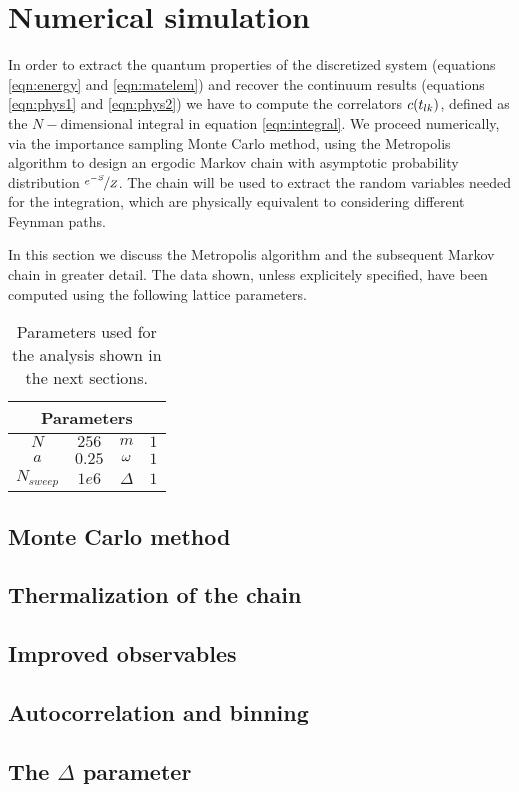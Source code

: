 \section{Numerical simulation}%
\label{sec:numericalsetup}
In order to extract the quantum properties of the discretized system (equations \ref{eqn:energy} and \ref{eqn:matelem}) and recover the continuum results (equations \ref{eqn:phys1} and \ref{eqn:phys2}) we have to compute the correlators $c(t_{lk})$, defined as the $N-$dimensional integral in equation
\ref{eqn:integral}.
We proceed numerically, via the importance sampling Monte Carlo method, using the Metropolis
algorithm to design an ergodic Markov chain with asymptotic probability distribution $\nicefrac{e^{-S}}{Z}$.
The chain will be used to extract the random variables needed for the integration, which are physically equivalent to considering
different Feynman paths.

In this section we discuss the Metropolis algorithm and the subsequent Markov chain in greater detail.
The data shown, unless explicitely specified, have been computed using the following lattice parameters.
\begin{table}[ht]
\centering
\begin{tabularx}{0.6\linewidth}{cccc}
\hline
\multicolumn{4}{c}{Parameters} \\ \hline
$N$              & $256$  & $m$              & $1$      \\
$a$              & $0.25$ & $\omega$             & $1$      \\
$N_{sweep}$      & $1e6$   & $\Delta$ & $1$ \\ \hline
\end{tabularx}
\caption{\label{tab:A3}Parameters used for the analysis shown in the next sections.}
\end{table}
\subsection{Monte Carlo method}%
\label{subsec:montecarlo}

\subsection{Thermalization of the chain}%
\label{subsec:thermalization}

\subsection{Improved observables}%
\label{subsec:improved}


\subsection{Autocorrelation and binning}
\label{subsec:autocorrelation}


\subsection{The $\Delta$ parameter}%
\label{subsec:delta}

